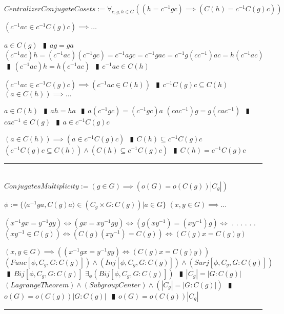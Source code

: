 \documentclass{book}
\newcommand{\abr}{:=}
\newcommand{\cont}{\phantom{.}. . .\phantom{.}}
\newcommand{\pipe}{$\phantom{(}\vrectangleblack\phantom{)}$}
\newcommand{\pr}[1]{\left(#1\right)}
\begin{document}
$CentralizerConjugateCosets \abr \forall_{c, g, h \in G}\pr{(h = c^{-1} g c) \implies \pr{C(h) = c^{-1} C(g) c}}$
\begin{enumerate}
  \lit $\pr{c^{-1} a c \in c^{-1} C(g) c} \implies \ldots$
  \begin{enumerate}
    \lit $a \in C(g)$ \pipe $a g = g a$
    \lit $(c^{-1} a c) h = (c^{-1} a c) (c^{-1} g c) = c^{-1} a g c = c^{-1} g a c = c^{-1} g (c c^{-1}) a c = h (c^{-1} a c)$ \pipe $(c^{-1} a c) h = h (c^{-1} a c)$ \pipe $c^{-1} a c \in C(h)$
  \end{enumerate}
  \lit $\pr{c^{-1} a c \in c^{-1} C(g) c} \implies \pr{c^{-1} a c \in C(h)}$ \pipe $c^{-1} C(g) c \subseteq C(h)$
  \lit $\pr{a \in C(h)} \implies \ldots$
  \begin{enumerate}
    \lit $a \in C(h)$ \pipe $a h = h a$ \pipe $a (c^{-1} g c) = (c^{-1} g c) a$
    \lit $(c a c^{-1}) g = g (c a c^{-1})$ \pipe $c a c^{-1} \in C(g)$ \pipe $a \in c^{-1} C(g) c$
  \end{enumerate}
  \lit $\pr{a \in C(h)} \implies \pr{a \in c^{-1} C(g) c}$ \pipe $C(h) \subseteq c^{-1} C(g) c$
  \lit $\pr{c^{-1} C(g) c \subseteq C(h)} \land \pr{C(h) \subseteq c^{-1} C(g) c}$ \pipe $C(h) = c^{-1} C(g) c$
\end{enumerate} \vspace{.75mm} \hrule \vspace{.75mm} \ \\ 

$ConjugatesMultiplicity \abr (g \in G) \implies \pr{o(G) = o\pr{C(g)} |C_g|}$
\begin{enumerate}
  \lit $\phi \abr \{\langle a^{-1} g a, C(g) a \rangle \in \pr{C_g \times G : C(g)} | a \in G\}$
  \lit $(x, y \in G) \implies \ldots$
  \begin{enumerate}
    \lit $(x^{-1} g x = y^{-1} g y) \iff (g x = x y^{-1} g y) \iff \pr{g (x y^{-1}) = (x y^{-1}) g} \iff$ \cont
    \lit \cont $\pr{x y^{-1} \in C(g)} \iff \pr{C(g) (x y^{-1}) = C(g)} \iff \pr{C(g) x = C(g) y}$
  \end{enumerate}
  \lit $(x, y \in G) \implies \pr{(x^{-1} g x = y^{-1} g y) \iff \pr{C(g) x = C(g) y}}$
  \lit $\pr{Func[\phi, C_g, G : C(g)]} \land \pr{Inj[\phi, C_g, G : C(g)]} \land \pr{Surj[\phi, C_g, G : C(g)]}$ \pipe $Bij[\phi, C_g, G : C(g)]$
  \lit $\exists_{\phi}\pr{Bij[\phi, C_g, G : C(g)]}$ \pipe $|C_g| = |G : C(g)|$
  \lit $(LagrangeTheorem) \land (SubgroupCenter) \land \pr{|C_g| = |G : C(g)|}$ \pipe $o(G) = o\pr{C(g)} |G : C(g)|$ \pipe $o(G) = o\pr{C(g)} |C_g|$ 
\end{enumerate} \vspace{.75mm} \hrule \vspace{.75mm} \ \\ 
\end{document}
